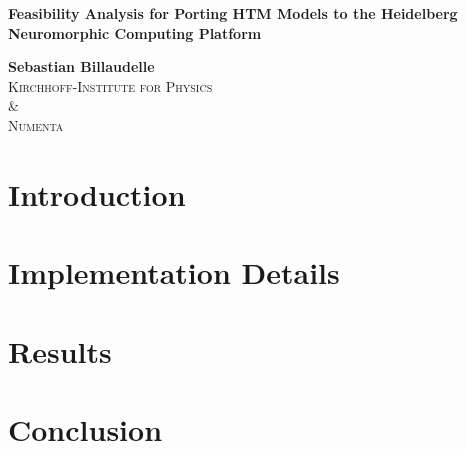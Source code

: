 \documentclass[twoside, letterpaper]{scrartcl}
\begin{document}
\setlength\abovedisplayskip{5pt}
\setlength\belowdisplayskip{20pt}
\setlength\abovedisplayshortskip{5pt}
\setlength\belowdisplayshortskip{20pt}


\begin{titlepage}
	\vspace{5cm}
	\begin{center}
		{\LARGE\bfseries Feasibility Analysis for Porting HTM Models to the Heidelberg Neuromorphic Computing Platform}
	\end{center}
	
	\vfill

	\begin{center}
		{\large\bfseries Sebastian Billaudelle}\\[0.8em]
		\textsc{Kirchhoff-Institute for Physics}\\
		\&\\
		\textsc{Numenta}
	\end{center}
\end{titlepage}

\restoregeometry

\cleardoublepage


\cleardoublepage

\tableofcontents
\cleardoublepage


\glsresetall

\section{Introduction}


\clearpage
\section{Implementation Details}


\clearpage
\section{Results}

\clearpage
\section{Conclusion}

\clearpage
\printbibliography
\end{document}
